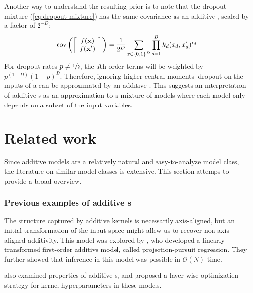 Another way to understand the resulting prior is to note that the dropout mixture (\cref{eq:dropout-mixture}) has the same covariance as an additive \gp{}, scaled by a factor of $2^{-D}$:
\begin{align}
\operatorname{cov}\left( \left[ \begin{array}{c} {f({\bf{x}})} \\ {f({\bf{x}}')} \end{array} \right] \right) = \frac{1}{2^{D}} \sum_{{\bf{r}} \in \{0,1\}^D}  \prod_{d=1}^D k_d(x_d, x_d')^{r_d}
\label{eq:dropout-mixture-covariance}
\end{align}
%
For dropout rates $p \neq \nicefrac{1}{2}$, the $d$th order terms will be weighted by $p^{(1-D)}(1-p)^D$.
Therefore, ignoring higher central moments, dropout on the inputs of a \gp{} can be approximated by an additive \gp{}.
This suggests an interpretation of additive \gp{}s as an approximation to a mixture of models where each model only depends on a subset of the input variables.






\section{Related work}

Since additive models are a relatively natural and easy-to-analyze model class, the literature on similar model classes is extensive.
This section attemps to provide a broad overview.

\subsubsection{Previous examples of additive \sgp{}s}

The structure captured by additive kernels is necessarily axis-aligned, but an initial transformation of the input space might allow us to recover non-axis aligned additivity.
This model was explored by \citet{gilboa2013scaling}, who developed a linearly-transformed first-order additive \gp{} model, called projection-pursuit \gp{} regression.
They further showed that inference in this model was possible in $\mathcal{O}(N)$ time.

\citet{durrande2011additive} also examined properties of additive \gp{}s, and proposed a layer-wise optimization strategy for kernel hyperparameters in these models.

